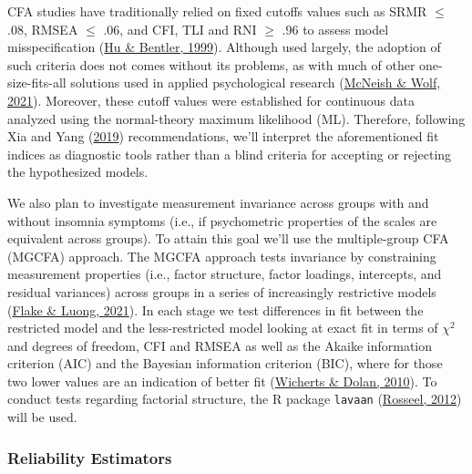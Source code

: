 \documentclass[
  ,doc,11pt, twoside,floatsintext]{apa6}
\begin{document}
CFA studies have traditionally relied on fixed cutoffs values such as SRMR \(\le\) .08, RMSEA \(\le\) .06, and CFI, TLI and RNI \(\ge\) .96 to assess model misspecification (\protect\hyperlink{ref-hu1999}{Hu \& Bentler, 1999}). Although used largely, the adoption of such criteria does not comes without its problems, as with much of other one-size-fits-all solutions used in applied psychological research (\protect\hyperlink{ref-mcneish2021}{McNeish \& Wolf, 2021}). Moreover, these cutoff values were established for continuous data analyzed using the normal-theory maximum likelihood (ML). Therefore, following Xia and Yang (\protect\hyperlink{ref-xia2019}{2019}) recommendations, we'll interpret the aforementioned fit indices as diagnostic tools rather than a blind criteria for accepting or rejecting the hypothesized models.

We also plan to investigate measurement invariance across groups with and without insomnia symptoms (i.e., if psychometric properties of the scales are equivalent across groups). To attain this goal we'll use the multiple-group CFA (MGCFA) approach. The MGCFA approach tests invariance by constraining measurement properties (i.e., factor structure, factor loadings, intercepts, and residual variances) across groups in a series of increasingly restrictive models (\protect\hyperlink{ref-flake2021}{Flake \& Luong, 2021}). In each stage we test differences in fit between the restricted model and the less-restricted model looking at exact fit in terms of \(\chi^2\) and degrees of freedom, CFI and RMSEA as well as the Akaike information criterion (AIC) and the Bayesian information criterion (BIC), where for those two lower values are an indication of better fit (\protect\hyperlink{ref-wicherts2010}{Wicherts \& Dolan, 2010}). To conduct tests regarding factorial structure, the R package \texttt{lavaan} (\protect\hyperlink{ref-lavaan}{Rosseel, 2012}) will be used.

\hypertarget{reliability-estimators}{%
\subsubsection{Reliability Estimators}\label{reliability-estimators}}
\end{document}
